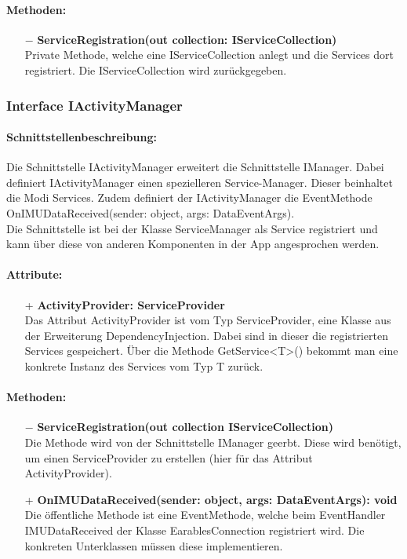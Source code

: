 \documentclass[a4paper,12pt]{article}
\begin{document}
	\paragraph{Methoden:}
	\begin{itemize}
		\item[$-$] \textbf{ServiceRegistration(out collection: IServiceCollection)}\\Private Methode, welche eine IServiceCollection anlegt und die Services dort registriert. Die IServiceCollection wird zurückgegeben. 
	\end{itemize}
	
	\subsubsection{Interface IActivityManager}
	\paragraph{Schnittstellenbeschreibung:}
	Die Schnittstelle IActivityManager erweitert die Schnittstelle IManager. Dabei definiert IActivityManager einen spezielleren Service-Manager. Dieser beinhaltet die Modi Services. Zudem definiert der IActivityManager die EventMethode OnIMUDataReceived(sender: object, args: DataEventArgs).\\
	Die Schnittstelle ist bei der Klasse ServiceManager als Service registriert und kann über diese von anderen Komponenten in der App angesprochen werden.
	
	\paragraph{Attribute:}
	\begin{itemize}
		\item[+] \textbf{ActivityProvider: ServiceProvider}\\Das Attribut ActivityProvider ist vom Typ ServiceProvider, eine Klasse aus der Erweiterung \Gls{DependencyInjection}. Dabei sind in dieser die registrierten Services gespeichert. Über die Methode GetService<T>() bekommt man eine konkrete Instanz des Services vom Typ T zurück. 
	\end{itemize}
	
	\paragraph{Methoden:}
	\begin{itemize}
		\item[$-$] \textbf{ServiceRegistration(out collection IServiceCollection)}\\Die Methode wird von der Schnittstelle IManager geerbt. Diese wird benötigt, um einen ServiceProvider zu erstellen (hier für das Attribut ActivityProvider).
		\item[+] \textbf{OnIMUDataReceived(sender: object, args: DataEventArgs): void}\\Die öffentliche Methode ist eine EventMethode, welche beim EventHandler IMUDataReceived der Klasse EarablesConnection registriert wird. Die konkreten Unterklassen müssen diese implementieren. 
	\end{itemize}
	
\end{document}
